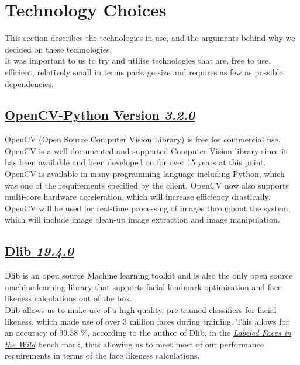 \documentclass{article}
\begin{document}
		\section{Technology Choices}
		This section describes the technologies in use, and the
		arguments behind why we decided on these technologies.\\
		It was important to us to try and utilise technologies that are,
		free to use, efficient, relatively small in terms package size and
		requires as few as possible dependencies. 
		\subsection{
		\href{http://docs.opencv.org/3.0-beta/doc/py_tutorials/py_tutorials.html}			{OpenCV-Python Version \textit{3.2.0}}}
		OpenCV (Open Source Computer Vision Library) is free for commercial use.
		OpenCV is a well-documented and supported Computer Vision library
		since it has been available and been developed on for over 15 years at this point.
		OpenCV is available in many programming language 
		including Python, which was one of the requirements specified by the client.
		OpenCV now also supports multi-core hardware acceleration, which will
		increase efficiency drastically. \\
		
		\noindent
		OpenCV will be used for real-time processing of images throughout the system,
		which will include image clean-up image extraction and image manipulation.
	
		\subsection{\href{http://dlib.net/}{Dlib \textit{19.4.0}}}
		Dlib is an open source Machine learning toolkit and is also
		the only open source machine learning library that supports facial landmark
		optimisation and face likeness calculations out of the box.\\ 
		
		\noindent
		Dlib allows us to make use of a high quality, pre-trained classifiers
		for facial likeness, which made use of over 3 million faces 
		during training. This allows for an accuracy of 99.38 \%, according to the author of Dlib, in the
		\href{http://vis-www.cs.umass.edu/lfw/}
		{\textit{Labeled Faces in the Wild}}
		bench mark, thus allowing us to meet most of our performance requirements
		in terms of the face likeness calculations. \\
		
\end{document}
